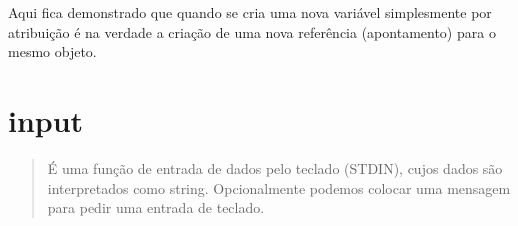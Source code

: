 \documentclass[letterpaper,10pt,brazil]{sphinxmanual}
\begin{document}
\begin{sphinxVerbatim}[commandchars=\\\{\}]
  
\end{sphinxVerbatim}

\begin{sphinxVerbatim}[commandchars=\\\{\}]
\end{sphinxVerbatim}

Aqui fica demonstrado que quando se cria uma nova variável simplesmente por atribuição é na verdade a criação de uma nova referência (apontamento) para o mesmo objeto.


\section{input}
\label{\detokenize{content/built-ins:input}}\begin{quote}

É uma função de entrada de dados pelo teclado (STDIN), cujos dados são interpretados como string.
Opcionalmente podemos colocar uma mensagem para pedir uma entrada de teclado.
\end{quote}

\begin{sphinxVerbatim}[commandchars=\\\{\}]
    

\end{sphinxVerbatim}

\begin{sphinxVerbatim}[commandchars=\\\{\}]
\end{sphinxVerbatim}

\begin{sphinxVerbatim}[commandchars=\\\{\}]
  
\end{sphinxVerbatim}

\begin{sphinxVerbatim}[commandchars=\\\{\}]
\end{sphinxVerbatim}
\end{document}
